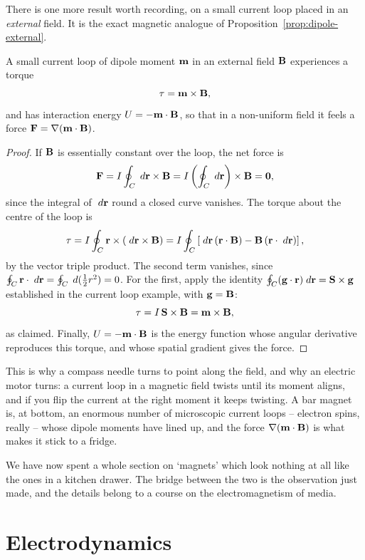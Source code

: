 \documentclass[a4paper]{scrartcl}
\begin{document}
There is one more result worth recording, on a small current loop placed in an \emph{external} field. It is the exact magnetic analogue of Proposition~\ref{prop:dipole-external}.

\begin{proposition}
	A small current loop of dipole moment $\mathbf{m}$ in an external field $\mathbf{B}$ experiences a torque
	$$
	\mathbf{\tau} = \mathbf{m}\times\mathbf{B},
	$$
	and has interaction energy $U = -\mathbf{m}\cdot\mathbf{B}$, so that in a non-uniform field it feels a force $\mathbf{F} = \nabla(\mathbf{m}\cdot\mathbf{B})$.
\end{proposition}
\begin{proof}
	If $\mathbf{B}$ is essentially constant over the loop, the net force is
	$$
	\mathbf{F} = I\oint_C \; d \mathbf{r}\times \mathbf{B} = I\left(\oint_C \; d \mathbf{r}\right)\times\mathbf{B} = \mathbf{0},
	$$
	since the integral of $\; d\mathbf{r}$ round a closed curve vanishes. The torque about the centre of the loop is
	$$
	\mathbf{\tau} = I\oint_C \mathbf{r}\times(\; d \mathbf{r}\times \mathbf{B}) = I\oint_C\left[\; d \mathbf{r}\,(\mathbf{r}\cdot\mathbf{B}) - \mathbf{B}\,(\mathbf{r}\cdot\; d\mathbf{r})\right],
	$$
	by the vector triple product. The second term vanishes, since $\oint_C \mathbf{r}\cdot\; d\mathbf{r} = \oint_C \; d(\tfrac12 r^2) = 0$. For the first, apply the identity $\oint_C(\mathbf{g}\cdot\mathbf{r})\; d\mathbf{r} = \mathbf{S}\times\mathbf{g}$ established in the current loop example, with $\mathbf{g} = \mathbf{B}$:
	$$
	\mathbf{\tau} = I\,\mathbf{S}\times \mathbf{B} = \mathbf{m}\times\mathbf{B},
	$$
	as claimed. Finally, $U = -\mathbf{m}\cdot\mathbf{B}$ is the energy function whose angular derivative reproduces this torque, and whose spatial gradient gives the force.
\end{proof}

This is why a compass needle turns to point along the field, and why an electric motor turns: a current loop in a magnetic field twists until its moment aligns, and if you flip the current at the right moment it keeps twisting. A bar magnet is, at bottom, an enormous number of microscopic current loops -- electron spins, really -- whose dipole moments have lined up, and the force $\nabla(\mathbf{m}\cdot\mathbf{B})$ is what makes it stick to a fridge.

We have now spent a whole section on `magnets' which look nothing at all like the ones in a kitchen drawer. The bridge between the two is the observation just made, and the details belong to a course on the electromagnetism of media.

\section{Electrodynamics}
\end{document}
